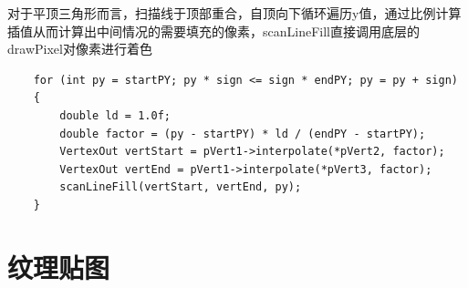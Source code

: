     \begin{spacing}{2.5}
    对于平顶三角形而言，扫描线于顶部重合，自顶向下循环遍历y值，通过比例计算插值从而计算出中间情况的需要填充的像素，scanLineFill直接调用底层的drawPixel对像素进行着色
    
    	
    \end{spacing}

	\begin{lstlisting}
    for (int py = startPY; py * sign <= sign * endPY; py = py + sign)
    {
    	double ld = 1.0f;
       	double factor = (py - startPY) * ld / (endPY - startPY);
       	VertexOut vertStart = pVert1->interpolate(*pVert2, factor);
       	VertexOut vertEnd = pVert1->interpolate(*pVert3, factor);
       	scanLineFill(vertStart, vertEnd, py);
   	}
	\end{lstlisting}


    \section{纹理贴图}
    
